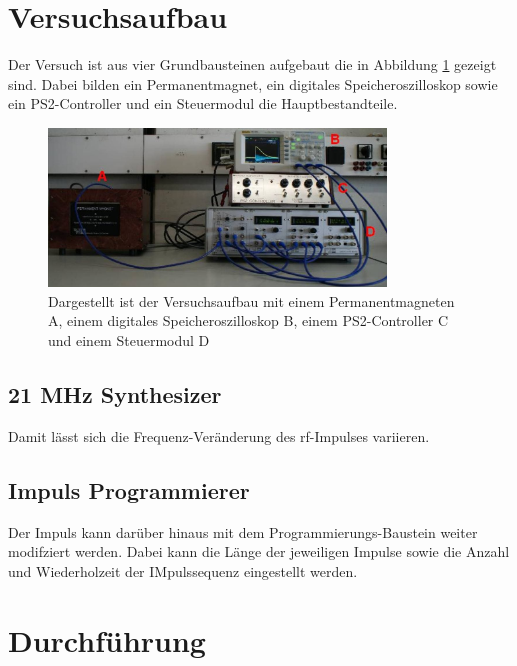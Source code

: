 \section{Versuchsaufbau}
Der Versuch ist aus vier Grundbausteinen aufgebaut die in Abbildung \ref{fig:versuchsaufbau}
gezeigt sind. Dabei bilden ein Permanentmagnet, ein digitales Speicheroszilloskop sowie ein
PS2-Controller und ein Steuermodul die Hauptbestandteile.
\begin{figure}
    \center
    \includegraphics[width=0.8\textwidth]{bilder/versuchsaufbau.jpg}
    \caption{Dargestellt ist der Versuchsaufbau mit einem Permanentmagneten A, einem digitales Speicheroszilloskop B, einem
    PS2-Controller C und einem Steuermodul D\cite{anleitung}}
    \label{fig:versuchsaufbau}
\end{figure}
\subsection*{21 MHz Synthesizer}
Damit lässt sich die Frequenz-Veränderung des rf-Impulses variieren.
\subsection*{Impuls Programmierer}
Der Impuls kann darüber hinaus mit dem Programmierungs-Baustein weiter modifziert werden.
Dabei kann die Länge der jeweiligen Impulse sowie die Anzahl und Wiederholzeit der IMpulssequenz eingestellt werden.

\section{Durchführung}
\label{sec:Durchfuehrung}
